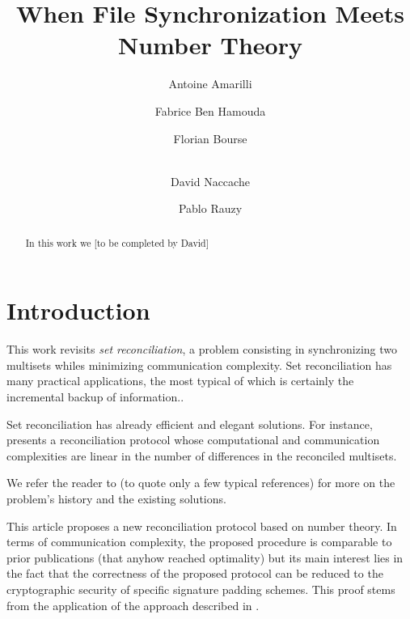 \documentclass[11pt]{llncs}
\begin{document}
\title{When File Synchronization Meets Number Theory}

\author{Antoine Amarilli \and Fabrice Ben Hamouda \and Florian Bourse \and\\
David Naccache \and Pablo Rauzy}


\maketitle

\begin{abstract}

In this work we [to be completed by David]

\end{abstract}

\section{Introduction}

This work revisits {\sl set reconciliation}, a problem consisting in synchronizing two multisets whiles minimizing communication complexity. Set reconciliation has many practical applications, the most typical of which is certainly the incremental backup of information.\smallskip.

Set reconciliation has already efficient and elegant solutions. For instance, \cite{PSRec} presents a reconciliation protocol whose computational and communication complexities are linear in the number of differences in the reconciled multisets.\smallskip

We refer the reader to \cite{PSRec,Mins1,Whats} (to quote only a few typical references) for more on the problem's history and the existing solutions.\smallskip

This article proposes a new reconciliation protocol based on number theory. In terms of communication complexity, the proposed procedure is comparable to prior publications \cite{PSRec} (that anyhow reached optimality) but its main interest lies in the fact that the correctness of the proposed protocol can be reduced to the cryptographic security of specific signature padding schemes. This proof stems from the application of the approach described in \cite{comparing}.\smallskip
\end{document}

